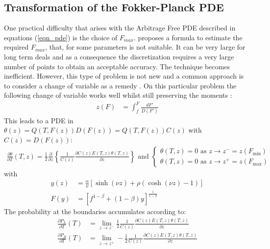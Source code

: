 \documentclass[]{rAMF2e}
\begin{document}
\subsection{Transformation of the Fokker-Planck PDE}
One practical difficulty that arises with the Arbitrage Free PDE described in equations (\ref{eqn_pde}) is the choice of $F_{max}$. \citet{hagan2013arbitrage} proposes a formula to estimate the required $F_{max}$, that, for some parameters is not suitable. It can be very large for long term deals and as a consequence the discretization requires a very large number of points to obtain an acceptable accuracy. The technique becomes inefficient. However, this type of problem is not new and a common approach is to consider a change of variable as a remedy \citep[p. 292 section 7.4]{andersen2010interest}. On this particular problem the following change of variable works well whilst still preserving the moments \citep{hagan2013change}:
\begin{align}\label{eqn-variable-transform}
z(F) &= \int_{f}^F \frac{dF'}{D(F')}
\end{align}
This leads to a PDE in $\theta(z) = Q(T,F(z))D(F(z)) = Q(T,F(z))C(z)$ with $C(z) = D(F(z))$:
\begin{align}\label{eqn-transform-pde}
\frac{\partial \theta}{\partial T}(T,z) = \frac{1}{2} \frac{\partial}{\partial z} \left\lbrace \frac{1}{C(z)} \frac{\partial C(z)E(T,z)\theta(T,z)}{\partial z} \right\rbrace
 \text{ and } \begin{cases}
\theta(T,z) = 0 \text{ as } z \to z^{-}=z(F_{\min})\\
\theta(T,z) = 0 \text{ as } z \to z^{+}=z(F_{\max})
\end{cases}
\end{align}
with \begin{align}
\label{eqn-y(z)}
y(z) &= \frac{\alpha}{\nu}\left[ \sinh(\nu z) + \rho (\cosh(\nu z) - 1) \right]\\ 
\label{eqn-F(z)}
F(y) &= \left[ f^{1-\beta} + (1-\beta)y \right]^{\frac{1}{1-\beta}}
\end{align}
The probability at the boundaries accumulates according to:
\begin{align}\label{eqn-transform-boundary}
\frac{\partial P_L}{\partial T}(T) &= \lim_{z \to z^{-}} \frac{1}{2} \frac{1}{C(z)} \frac{\partial C(z)E(T,z)\theta(T,z)}{\partial z}\\
\frac{\partial P_R}{\partial T}(T) &= \lim_{z \to z^{+}}  -\frac{1}{2} \frac{1}{C(z)} \frac{\partial C(z)E(T,z)\theta(T,z)}{\partial z}
\end{align}
\end{document}
